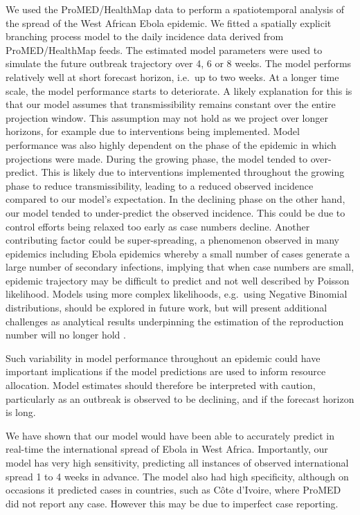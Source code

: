 \documentclass[9pt,twocolumn,twoside,lineno]{pnas-new}
\begin{document}
We used the ProMED/HealthMap data to perform a spatiotemporal analysis
of the spread of the West African Ebola epidemic. We fitted a spatially
explicit branching process model to the daily incidence data derived
from ProMED/HealthMap feeds. The estimated model parameters were used to
simulate the future outbreak trajectory over 4, 6 or 8 weeks. The model
performs relatively well at short forecast horizon, i.e.~up to
two weeks. At a
longer time scale, the model performance starts to deteriorate. A likely
explanation for this is that our model assumes that transmissibility
remains constant over the entire projection window. This assumption may
not hold as we project over longer horizons, for example due to
interventions being implemented. Model performance was also highly
dependent on the phase of the epidemic in which projections were made.
During the growing phase, the model tended to over-predict. This is
likely due to interventions implemented throughout the growing phase to
reduce transmissibility, leading to a reduced observed incidence
compared to our model's expectation. In the declining phase on the other
hand, our model tended to under-predict the observed incidence. This
could be due to control efforts being relaxed too early as case
numbers decline. Another contributing factor could be super-spreading,
a phenomenon observed in many
epidemics including Ebola epidemics \cite{lau2017spatial,
  agua2016exposure}
whereby a small number of cases generate a large
number of secondary infections, implying that when case numbers are
small, epidemic trajectory may be difficult to predict and not well
described by Poisson likelihood. Models using more complex likelihoods,
e.g.~using Negative Binomial distributions, should be explored in future
work, but will present additional challenges as analytical results
underpinning the estimation of the reproduction number will no longer
hold \cite{cori2013new}.

Such variability in model performance throughout an epidemic could have
important implications if the model predictions are used to inform
resource allocation. Model estimates should therefore be interpreted
with caution, particularly as an outbreak is observed to be declining,
and if the forecast horizon is long.

We have shown that our model would have been
able to accurately predict in real-time the international spread of
Ebola in West Africa. Importantly, our
model has very high sensitivity, predicting all instances of observed
international spread 1 to 4 weeks in advance. The model also had high
specificity, although on occasions it predicted cases in
countries, such as Côte d'Ivoire, where ProMED did not report any case.
However this may be due to imperfect case reporting.
\end{document}
